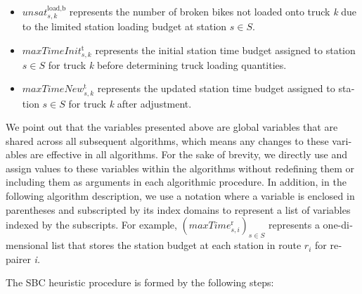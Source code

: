 \documentclass[
  english,
]{article}
\begin{document}
\begin{otherlanguage}{english}
\begin{itemize}
  station \(s \in S\) from truck \emph{k} due to the limited station unloading budget.
\item
  \protect{}\label{p0370}
  \(\mathit{unsa}t_{s,k}^{\text{load},\text{b}}\) represents the number of broken bikes not loaded
  onto truck \emph{k} due to the limited station loading budget at station \(s \in S\).
\item
  \protect{}\label{p0375}
  \(\mathit{maxTimeIni}t_{s,k}^{\text{t}}\) represents the initial station time budget assigned to
  station \(s \in S\) for truck \emph{k} before determining truck loading quantities.
\item
  \protect{}\label{p0380}
  \(\mathit{maxTimeNe}w_{s,k}^{\text{t}}\) represents the updated station time budget assigned to
  station \(s \in S\) for truck \emph{k} after adjustment.
\end{itemize}

\protect{}\label{p0385}
We point out that the variables presented above are global variables that are shared across all
subsequent algorithms, which means any changes to these variables are effective in all algorithms.
For the sake of brevity, we directly use and assign values to these variables within the algorithms
without redefining them or including them as arguments in each algorithmic procedure. In addition,
in the following algorithm description, we use a notation where a variable is enclosed in
parentheses and subscripted by its index domains to represent a list of variables indexed by the
subscripts. For example, \(\left( {\mathit{maxTim}e_{s,i}^{\text{r}}} \right)_{s \in S}\) represents
a one-dimensional list that stores the station budget at each station in route \(r_{i}\) for
repairer \emph{i.}

\protect{}\label{p0390}
The SBC heuristic procedure is formed by the following steps:


\end{otherlanguage}
\end{document}
